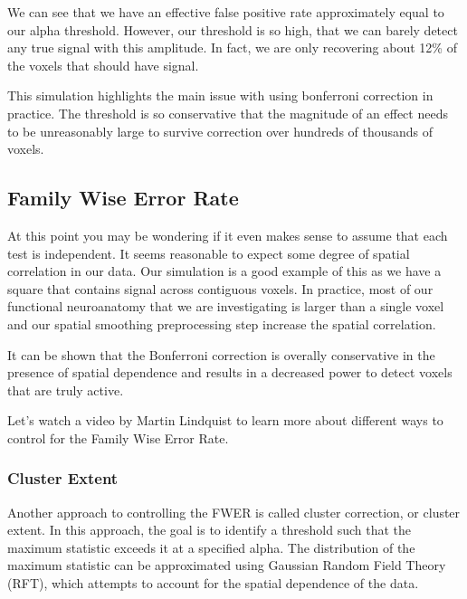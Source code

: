 \documentclass[letterpaper,10pt,english]{sphinxmanual}
\begin{document}
We can see that we have an effective false positive rate approximately equal to our alpha threshold. However, our threshold is so high, that we can barely detect any true signal with this amplitude. In fact, we are only recovering about 12\% of the voxels that should have signal.

This simulation highlights the main issue with using bonferroni correction in practice. The threshold is so conservative that the magnitude of an effect needs to be unreasonably large to survive correction over hundreds of thousands of voxels.


\subsection{Family Wise Error Rate}
\label{\detokenize{content/Thresholding_Group_Analyses:family-wise-error-rate}}
At this point you may be wondering if it even makes sense to assume that each test is independent. It seems reasonable to expect some degree of spatial correlation in our data. Our simulation is a good example of this as we have a square that contains signal across contiguous voxels. In practice, most of our functional neuroanatomy that we are investigating is larger than a single voxel and our spatial smoothing preprocessing step increase the spatial correlation.

It can be shown that the Bonferroni correction is overally conservative in the presence of spatial dependence and results in a decreased power to detect voxels that are truly active.

Let’s watch a video by Martin Lindquist to learn more about different ways to control for the Family Wise Error Rate.

\begin{sphinxVerbatim}[commandchars=\\\{\}]
\end{sphinxVerbatim}

\noindent{}


\subsubsection{Cluster Extent}
\label{\detokenize{content/Thresholding_Group_Analyses:cluster-extent}}
Another approach to controlling the FWER is called cluster correction, or cluster extent. In this approach, the goal is to identify a threshold such that the maximum statistic exceeds it at a specified alpha. The distribution of the maximum statistic can be approximated using Gaussian Random Field Theory (RFT), which attempts to account for the spatial dependence of the data.
\end{document}
